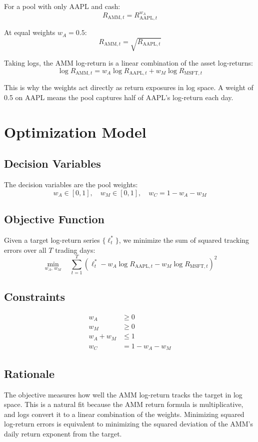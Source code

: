 \documentclass[12pt]{article}
\begin{document}
For a pool with only AAPL and cash:
\[
R_{\text{AMM},t} = R_{\text{AAPL},t}^{w_A}
\]

At equal weights $w_A = 0.5$:
\[
R_{\text{AMM},t} = \sqrt{R_{\text{AAPL},t}}
\]

Taking logs, the AMM log-return is a linear combination of the asset log-returns:
\[
\log R_{\text{AMM},t} = w_A \log R_{\text{AAPL},t} + w_M \log R_{\text{MSFT},t}
\]

This is why the weights act directly as return exposures in log space. A weight of 0.5 on AAPL means the pool captures half of AAPL's log-return each day.

\section{Optimization Model}

\subsection*{Decision Variables}

The decision variables are the pool weights:
\[
w_A \in [0,1], \quad w_M \in [0,1], \quad w_C = 1 - w_A - w_M
\]

\subsection*{Objective Function}

Given a target log-return series $\{\ell_t^*\}$, we minimize the sum of squared tracking errors over all $T$ trading days:
\[
\min_{w_A,\, w_M} \quad \sum_{t=1}^{T} \left( \ell_t^* - w_A \log R_{\text{AAPL},t} - w_M \log R_{\text{MSFT},t} \right)^2
\]

\subsection*{Constraints}

\begin{align*}
w_A &\geq 0 \\
w_M &\geq 0 \\
w_A + w_M &\leq 1 \\
w_C &= 1 - w_A - w_M
\end{align*}

\subsection*{Rationale}

The objective measures how well the AMM log-return tracks the target in log space. This is a natural fit because the AMM return formula is multiplicative, and logs convert it to a linear combination of the weights. Minimizing squared log-return errors is equivalent to minimizing the squared deviation of the AMM's daily return exponent from the target.
\end{document}
